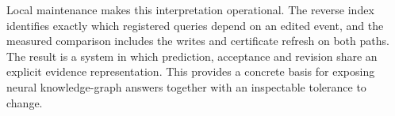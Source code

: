 Local maintenance makes this interpretation operational. The reverse index identifies exactly which registered queries depend on an edited event, and the measured comparison includes the writes and certificate refresh on both paths. The result is a system in which prediction, acceptance and revision share an explicit evidence representation. This provides a concrete basis for exposing neural knowledge-graph answers together with an inspectable tolerance to change.
